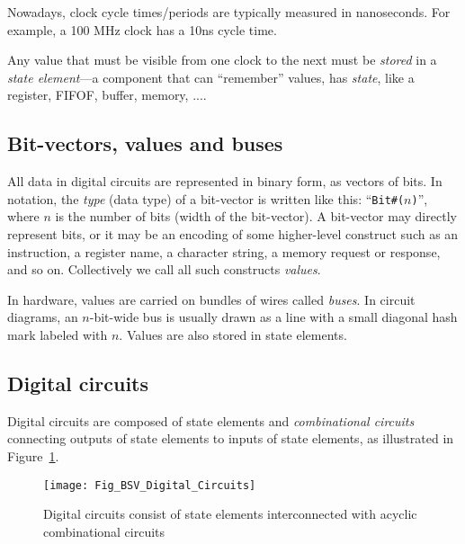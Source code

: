 Nowadays, clock cycle times/periods are typically measured in
nanoseconds. For example, a 100 MHz clock has a 10ns cycle time.


Any value that must be visible from one clock to the next must be
\emph{stored} in a \emph{state element}---a component that can
``remember'' values, {\ie} has \emph{state}, like a register, FIFOF,
buffer, memory, ....


\subsection{Bit-vectors, values and buses}


All data in digital circuits are represented in binary form, as
vectors of bits.  In {\BSV} notation, the \emph{type} (data type) of a
bit-vector is written like this: ``{\tt Bit\#($n$)}'', where $n$ is
the number of bits (width of the bit-vector).  A bit-vector may
directly represent bits, or it may be an encoding of some higher-level
construct such as an instruction, a register name, a character string,
a memory request or response, and so on.  Collectively we call all
such constructs \emph{values}.

In hardware, values are carried on bundles of wires called
\emph{buses}.  In circuit diagrams, an $n$-bit-wide bus is usually
drawn as a line with a small diagonal hash mark labeled with $n$.
Values are also stored in state elements.


\subsection{Digital circuits}


Digital circuits are composed of state elements and
\emph{combinational circuits} connecting outputs of state elements to
inputs of state elements, as illustrated in
Figure~\ref{Fig_BSV_Digital_Circuits}.
\begin{figure}[htbp]
  \centerline{\texttt{[image: Fig\_BSV\_Digital\_Circuits]}}
  \caption{\label{Fig_BSV_Digital_Circuits}
           Digital circuits consist of state elements interconnected
	   with acyclic combinational circuits}
\end{figure}

